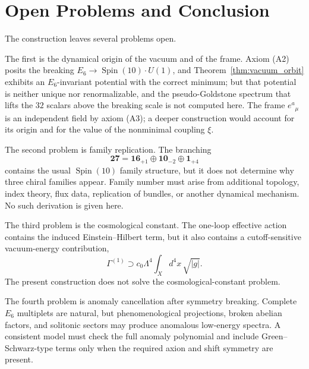 \documentclass[aps,prd,preprint,longbibliography,nofootinbib,superscriptaddress,floatfix]{revtex4-2}
\newcommand{\Spin}{\operatorname{Spin}}
\begin{document}

\section{Open Problems and Conclusion}
\label{sec:open_problems}

The construction leaves several problems open.

The first is the dynamical origin of the vacuum and of the frame. Axiom (A2)
posits the breaking \(E_6\to\Spin(10)\cdot U(1)\), and
Theorem~\ref{thm:vacuum_orbit} exhibits an \(E_6\)-invariant potential with the
correct minimum; but that potential is neither unique nor renormalizable, and
the pseudo-Goldstone spectrum that lifts the \(32\) scalars above the breaking
scale is not computed here. The frame \(e^a{}_\mu\) is an independent field by
axiom (A3); a deeper construction would account for its origin and for the value
of the nonminimal coupling \(\xi\).

The second problem is family replication. The branching
\begin{equation}
    \mathbf{27}
    =
    \mathbf{16}_{+1}
    \oplus
    \mathbf{10}_{-2}
    \oplus
    \mathbf{1}_{+4}
    \label{eq:open_27_branching}
\end{equation}
contains the usual \(\Spin(10)\) family structure, but it does not determine
why three chiral families appear. Family number must arise from additional
topology, index theory, flux data, replication of bundles, or another
dynamical mechanism. No such derivation is given here.

The third problem is the cosmological constant. The one-loop effective action
contains the induced Einstein--Hilbert term, but it also contains a
cutoff-sensitive vacuum-energy contribution,
\begin{equation}
    \Gamma^{(1)}
    \supset
    c_0\Lambda^4
    \int_X d^4x\,\sqrt{|g|}.
    \label{eq:open_cc}
\end{equation}
The present construction does not solve the cosmological-constant problem.

The fourth problem is anomaly cancellation after symmetry breaking. Complete
\(E_6\) multiplets are natural, but phenomenological projections, broken
abelian factors, and solitonic sectors may produce anomalous low-energy
spectra. A consistent model must check the full anomaly polynomial and include
Green--Schwarz-type terms only when the required axion and shift symmetry are
present.
\end{document}
